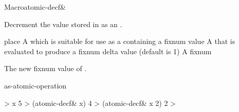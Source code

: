 \documentclass[10pt,twoside,english,pdftex]{article}
\begin{document}
\begin{functiondoc}{Macro}{atomic-decf\&}{
    }
%

\fnsyntax \fnpurpose Decrement the  value stored in
 as an .

\fnpackage {}

\fnmodule {}

\fnargs
\begin{args}{place}
\arg[place] A  which is suitable for use as a
 containing a fixnum value
 A  that is evaluated to produce a fixnum delta
value (default is 1)
 A fixnum
\end{args}

\fnreturns The new fixnum value of . 

\begin{alsos}{as-atomic-operation}
\end{alsos}

\fnexamples
%
\W\supp
\begin{example}
  > x
  5
  > (atomic-decf\& x)
  4
  > (atomic-decf\& x 2)
  2
  >
\end{example}

\end{functiondoc}

\end{document}
